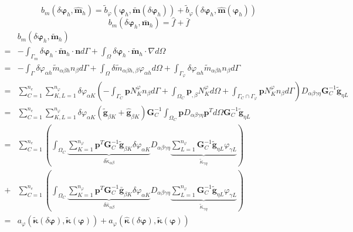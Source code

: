 \begin{equation}
b_m(\delta \boldsymbol \varphi_h,\hat{\boldsymbol m}_h) = \tilde b_\varphi(\boldsymbol \varphi_h, \tilde{\boldsymbol m}(\delta \boldsymbol \varphi_h)) + \tilde b_\varphi(\delta \boldsymbol \varphi_h,\hat{\boldsymbol m}(\boldsymbol \varphi_h))
\end{equation}
\begin{equation}
b_m(\delta \boldsymbol \varphi_h,\bar{\boldsymbol m}_h) = \hat f + \bar f
\end{equation}
\begin{equation}
\begin{aligned}
&b_m(\delta \boldsymbol \varphi_h,\tilde{\boldsymbol m}_h) \\
=& - \int_{\Gamma_m} \delta \boldsymbol \varphi_h \cdot \tilde{\boldsymbol m}_h \cdot \boldsymbol n d\Gamma + \int_\Omega \delta \boldsymbol \varphi_h \cdot \tilde{\boldsymbol m}_h \cdot \nabla d\Omega \\
=& - \int_{\Gamma} \delta \varphi_{\alpha h} \tilde m_{\alpha\beta h} n_\beta d\Gamma + \int_\Omega \delta \tilde m_{\alpha\beta h,\beta} \varphi_{\alpha h} d\Omega + \int_{\Gamma_\varphi} \delta \varphi_{\alpha h} \tilde m_{\alpha\beta h} n_\beta d\Gamma \\
=& \sum_{C=1}^{n_e}\sum_{K,L=1}^{n_\varphi} \delta \varphi_{\alpha K} \left(
    - \int_{\Gamma_C} \boldsymbol p N_K^\varphi n_\beta d\Gamma + \int_{\Omega_C} \boldsymbol p_{,\beta} N_K^\varphi d\Omega + \int_{\Gamma_C\cap \Gamma_\varphi} \boldsymbol p N_K^\varphi n_\beta d\Gamma
\right) D_{\alpha\beta\gamma\eta}\boldsymbol G_C^{-1}\tilde{\boldsymbol g}_{\eta L} \\
=& \sum_{C=1}^{n_e}\sum_{K,L=1}^{n_\varphi} \delta \varphi_{\alpha K}(\tilde{\boldsymbol g}_{\beta K} + \hat{\boldsymbol g}_{\beta K})\boldsymbol G_C^{-1} \int_{\Omega_C} \boldsymbol p D_{\alpha\beta\gamma\eta}\boldsymbol p^T d\Omega \boldsymbol G_C^{-1} \tilde{\boldsymbol g}_{\eta L} \\
=& \sum_{C=1}^{n_e} \left(
    \int_{\Omega_C} \underbrace{\sum_{K=1}^{n_\varphi}\boldsymbol p^T\boldsymbol G_C^{-1}\tilde{\boldsymbol g}_{\beta K}\delta \varphi_{\alpha K}}_{\delta \tilde \kappa_{\alpha\beta}} D_{\alpha\beta\gamma\eta} \underbrace{\sum_{L=1}^{n_\varphi} \boldsymbol G_C^{-1}\tilde{\boldsymbol g}_{\eta L} \varphi_{\gamma L}}_{\tilde \kappa_{\gamma\eta}}
\right) \\
+& \sum_{C=1}^{n_e} \left(
    \int_{\Omega_C} \underbrace{\sum_{K=1}^{n_\varphi}\boldsymbol p^T\boldsymbol G_C^{-1}\bar{\boldsymbol g}_{\beta K}\delta \varphi_{\alpha K}}_{\delta \bar \kappa_{\alpha\beta}} D_{\alpha\beta\gamma\eta} \underbrace{\sum_{L=1}^{n_\varphi} \boldsymbol G_C^{-1}\tilde{\boldsymbol g}_{\eta L} \varphi_{\gamma L}}_{\tilde \kappa_{\gamma\eta}}
\right) \\
=& a_\varphi \left(\tilde{\boldsymbol \kappa}(\delta \boldsymbol \varphi),\tilde{\boldsymbol \kappa}(\boldsymbol \varphi)\right) +a_\varphi \left(\hat{\boldsymbol \kappa}(\delta \boldsymbol \varphi),\tilde{\boldsymbol \kappa}(\boldsymbol \varphi)\right)
\end{aligned}
\end{equation}